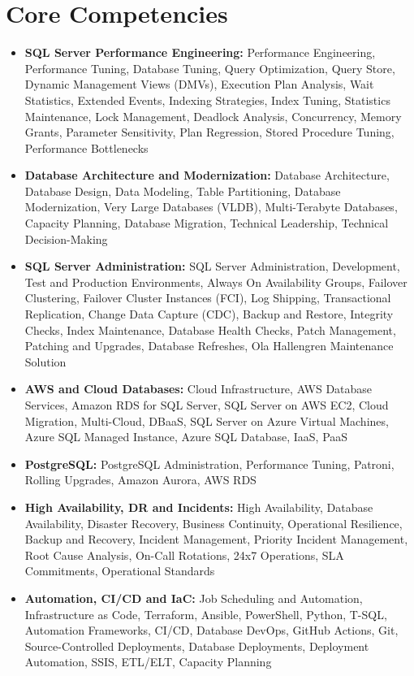 \documentclass[10pt,a4paper]{article}
\begin{document}
\section{Core Competencies}
\begin{itemize}
  \item \textbf{SQL Server Performance Engineering:} Performance Engineering, Performance Tuning, Database Tuning, Query Optimization, Query Store, Dynamic Management Views (DMVs), Execution Plan Analysis, Wait Statistics, Extended Events, Indexing Strategies, Index Tuning, Statistics Maintenance, Lock Management, Deadlock Analysis, Concurrency, Memory Grants, Parameter Sensitivity, Plan Regression, Stored Procedure Tuning, Performance Bottlenecks
  \item \textbf{Database Architecture and Modernization:} Database Architecture, Database Design, Data Modeling, Table Partitioning, Database Modernization, Very Large Databases (VLDB), Multi-Terabyte Databases, Capacity Planning, Database Migration, Technical Leadership, Technical Decision-Making
  \item \textbf{SQL Server Administration:} SQL Server Administration, Development, Test and Production Environments, Always On Availability Groups, Failover Clustering, Failover Cluster Instances (FCI), Log Shipping, Transactional Replication, Change Data Capture (CDC), Backup and Restore, Integrity Checks, Index Maintenance, Database Health Checks, Patch Management, Patching and Upgrades, Database Refreshes, Ola Hallengren Maintenance Solution
  \item \textbf{AWS and Cloud Databases:} Cloud Infrastructure, AWS Database Services, Amazon RDS for SQL Server, SQL Server on AWS EC2, Cloud Migration, Multi-Cloud, DBaaS, SQL Server on Azure Virtual Machines, Azure SQL Managed Instance, Azure SQL Database, IaaS, PaaS
  \item \textbf{PostgreSQL:} PostgreSQL Administration, Performance Tuning, Patroni, Rolling Upgrades, Amazon Aurora, AWS RDS
  \item \textbf{High Availability, DR and Incidents:} High Availability, Database Availability, Disaster Recovery, Business Continuity, Operational Resilience, Backup and Recovery, Incident Management, Priority Incident Management, Root Cause Analysis, On-Call Rotations, 24x7 Operations, SLA Commitments, Operational Standards
  \item \textbf{Automation, CI/CD and IaC:} Job Scheduling and Automation, Infrastructure as Code, Terraform, Ansible, PowerShell, Python, T-SQL, Automation Frameworks, CI/CD, Database DevOps, GitHub Actions, Git, Source-Controlled Deployments, Database Deployments, Deployment Automation, SSIS, ETL/ELT, Capacity Planning

\end{itemize}
\end{document}
